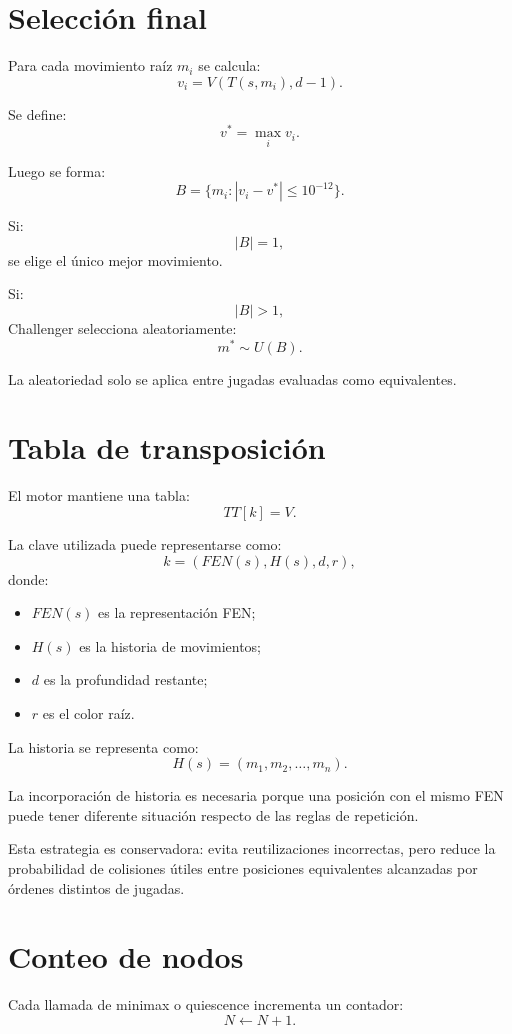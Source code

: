 \documentclass[11pt,a4paper]{article}
\begin{document}
\section{Selección final}

Para cada movimiento raíz $m_i$ se calcula:
\[
v_i=V(T(s,m_i),d-1).
\]

Se define:
\[
v^\ast=\max_i v_i.
\]

Luego se forma:
\[
B=
\{m_i:|v_i-v^\ast|\le10^{-12}\}.
\]

Si:
\[
|B|=1,
\]
se elige el único mejor movimiento.

Si:
\[
|B|>1,
\]
Challenger selecciona aleatoriamente:
\[
m^\ast\sim U(B).
\]

La aleatoriedad solo se aplica entre jugadas evaluadas como equivalentes.

\section{Tabla de transposición}

El motor mantiene una tabla:
\[
TT[k]=V.
\]

La clave utilizada puede representarse como:
\[
k=
(
FEN(s),
H(s),
d,
r
),
\]
donde:

\begin{itemize}
    \item $FEN(s)$ es la representación FEN;
    \item $H(s)$ es la historia de movimientos;
    \item $d$ es la profundidad restante;
    \item $r$ es el color raíz.
\end{itemize}

La historia se representa como:
\[
H(s)=(m_1,m_2,\ldots,m_n).
\]

La incorporación de historia es necesaria porque una posición con el mismo FEN
puede tener diferente situación respecto de las reglas de repetición.

Esta estrategia es conservadora: evita reutilizaciones incorrectas, pero reduce
la probabilidad de colisiones útiles entre posiciones equivalentes alcanzadas
por órdenes distintos de jugadas.

\section{Conteo de nodos}

Cada llamada de minimax o quiescence incrementa un contador:
\[
N\leftarrow N+1.
\]
\end{document}
